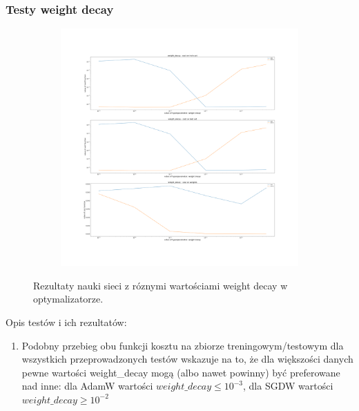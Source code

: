 \documentclass[12pt]{article}
\begin{document}
\subsubsection{Testy weight decay}
\begin{figure}[H]
	\centering
	\begin{subfigure}[b]{1\linewidth}
		\includegraphics[width=\linewidth]{Comparision_weight_decay_conv_2.png}
	\end{subfigure}
	\label{fig:decay_cnn}
	\caption{Rezultaty nauki sieci z róznymi wartościami weight decay w optymalizatorze.}
\end{figure}
Opis testów i ich rezultatów:
\begin{enumerate}
	\item Podobny przebieg obu funkcji kosztu na zbiorze treningowym/testowym dla wszystkich przeprowadzonych testów wskazuje na to, że dla większości danych pewne wartości weight\_decay mogą (albo nawet powinny) być preferowane nad inne: dla AdamW wartości $weight\_decay \le 10^{-3}$, dla SGDW wartości $weight\_decay \ge 10^{-2}$
\end{enumerate}
\end{document}
